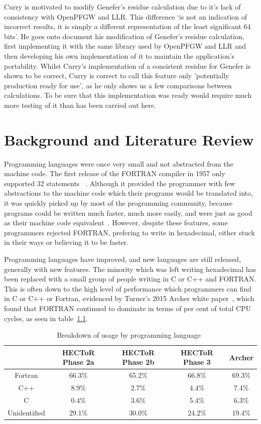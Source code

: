 \documentclass{report}[a4]
\begin{document}
Curry is motivated to modify Genefer's residue calculation due to it's lack of consistency with OpenPFGW and LLR. This difference `is not an indication of incorrect results, it is simply a different representation of the least significant 64 bits'. He goes onto document his modification of Genefer's residue calculation, first implementing it with the same library used by OpenPFGW and LLR and then developing his own implementation of it to maintain the application's portability. Whilst Curry's implementation of a consistent residue for Genefer is shown to be correct, Curry is correct to call this feature only 'potentially production ready for use', as he only shows us a few comparisons between calculations. To be sure that this implementation was ready would require much more testing of it than has been carried out here.



\chapter{Background and Literature Review} %
Programming languages were once very small and not abstracted from the machine code. The first release of the FORTRAN compiler in 1957 only supported 32 statements~\cite{Backus:1957:FAC:1455567.1455599} . Although it provided the programmer with few abstractions to the machine code which their programs would be translated into, it was quickly picked up by most of the programming community, because programs could be written much faster, much more easily, and were just as good as their machine code equivalent~\cite{metcalf2011seven}. However, despite these features, some programmers rejected FORTRAN, prefering to write in hexadecimal, either stuck in their ways or believing it to be faster.

Programming languages have improved, and new languages are still released, generally with new features. The minority which was left writing hexadecimal has been replaced with a small group of people writing in C or C++ and FORTRAN. This is often down to the high level of performance which programmers can find in C or C++ or Fortran, evidenced by Turner's 2015 Archer white paper~\cite{Turner2015}, which found that FORTRAN continued to dominate in terms of per cent of total CPU cycles, as seen in table~\ref{tab:langs}.
\begin{table}[h]
  \centering
  \label{tab:langs}
  \begin{tabular}{|c|c|c|c|c|}
    \hline
    & \textbf{HECToR Phase 2a} & \textbf{HECToR Phase 2b} & \textbf{HECToR Phase 3} & \textbf{Archer} \\
    \hline
    Fortran & 66.3\% & 65.2\% & 66.8\% & 69.3\% \\
    \hline
    C++ & 8.9\% & 2.7\% & 4.4\% & 7.4\% \\
    \hline
    C & 0.4\% & 3.6\% & 5.4\% & 6.3\% \\
    \hline
    Unidentified & 29.1\% &  30.0\% & 24.2\% & 19.4\% \\
    \hline
  \end{tabular}
  \caption{Breakdown of usage by programming language~\cite{Turner2015}}
\end{table}
\end{document}
